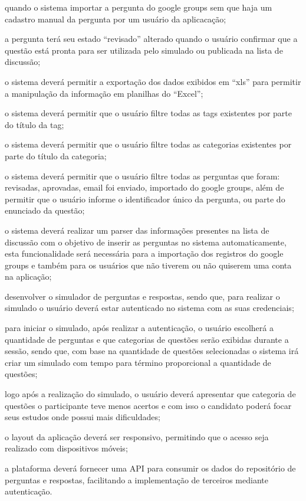 \begin{alineas}
    quando o sistema importar a pergunta do google groups sem que haja um
    cadastro manual da pergunta por um usuário da aplicacação;
    \item a pergunta terá seu estado ``revisado'' alterado quando o usuário
    confirmar que a questão está pronta para ser utilizada pelo simulado ou
    publicada na lista de discussão;
    \item o sistema deverá permitir a exportação dos dados exibidos em ``xls''
    para permitir a manipulação da informação em planilhas do ``Excel'';
    \item o sistema deverá permitir que o usuário filtre todas as tags
    existentes por parte do título da tag;
    \item o sistema deverá permitir que o usuário filtre todas as categorias
    existentes por parte do título da categoria;
    \item o sistema deverá permitir que o usuário filtre todas as perguntas que
    foram: revisadas, aprovadas, email foi enviado, importado do google groups,
    além de permitir que o usuário informe o identificador único da pergunta, ou
    parte do enunciado da questão;
    \item o sistema deverá realizar um parser das informações presentes na lista
    de discussão com o objetivo de inserir as perguntas no sistema
    automaticamente, esta funcionalidade será necessária para a importação dos
    registros do google groups e também para os usuários que não tiverem ou não
    quiserem uma conta na aplicação;
    \item desenvolver o simulador de perguntas e respostas, sendo que, para
    realizar o simulado o usuário deverá estar autenticado no sistema com as
    suas credenciais;
    \item para iniciar o simulado, após realizar a autenticação, o usuário
    escolherá a quantidade de perguntas e que categorias de questões serão
    exibidas durante a sessão, sendo que, com base na quantidade de questões
    selecionadas o sistema irá criar um simulado com tempo para término
    proporcional a quantidade de questões;
    \item logo após a realização do simulado, o usuário deverá apresentar que 
    categoria de questões o participante teve menos acertos e com isso o
    candidato poderá focar seus estudos onde possui mais dificuldades;
    \item o layout da aplicação deverá ser responsivo, permitindo que o acesso
    seja realizado com dispositivos móveis;
    \item a plataforma deverá fornecer uma \acs{API} para consumir os dados do
    repositório de perguntas e respostas, facilitando a implementação de
    terceiros mediante autenticação.
\end{alineas}

